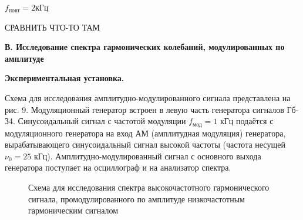 \documentclass[14pt]{article}
\begin{document}
\vspace{1cm}
$f_{\text{повт}} = 2$кГц


\newpage
\vspace*{5cm}
СРАВНИТЬ ЧТО-ТО ТАМ
\newpage
















\newpage
\textbf{В. Исследование спектра гармонических колебаний, модулированных по амплитуде}

\textbf{Экспериментальная установка.} 

Схема для исследования амплитудно-модулированного сигнала представлена на рис. 9. Модуляционный генератор встроен в левую часть генератора сигналов Гб-З4. Синусоидальный сигнал с частотой модуляции $f_{\text{мод}} = 1$ кГц подаётся с модуляционного генератора на вход АМ (амплитудная модуляция) генератора, вырабатывающего синусоидальный сигнал высокой частоты (частота несущей $\nu_0 = 25$ кГц). Амплитудно-модулированный сигнал с основного выхода генератора поступает на осциллограф и на анализатор спектра.

\begin{figure}[h!]
	\caption{Схема для исследования спектра высокочастотного гармонического сигнала, промодулированного по амплитуде низкочастотным гармоническим сигналом}
	\label{fig:image}
\end{figure}
\end{document}
